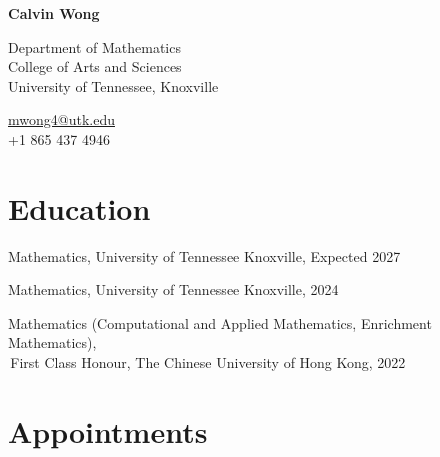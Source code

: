 \documentclass[11pt,letterpaper]{report}
\newcommand{\myname}{Calvin Wong}
\newcommand{\namefont}[1]{{\normalfont\bfseries\Huge{#1}}}
\begin{document}
    \raggedright{}

    \namefont{\myname}

    \vspace{1em}
    \begin{minipage}[t]{0.700\textwidth}
        Department of Mathematics \\
        College of Arts and Sciences \\
        University of Tennessee, Knoxville
    \end{minipage}
    \begin{minipage}[t]{0.295\textwidth}
        \flushright{}
        \href{mailto:mwong4@utk.edu}{mwong4@utk.edu} \\
        +1 865 437 4946 \\
    \end{minipage}


    \section*{Education}

    \begin{tablist}

        \item[Ph.D.] \tab{} Mathematics, University of Tennessee Knoxville, Expected 2027
        \item[M.S.] \tab{} Mathematics, University of Tennessee Knoxville, 2024
        \item[B.S.]  \tab{} Mathematics (Computational and Applied Mathematics, Enrichment Mathematics),\\
       \,First Class Honour, The Chinese University of Hong Kong, 2022

    \end{tablist}



    \section*{Appointments}
\end{document}
